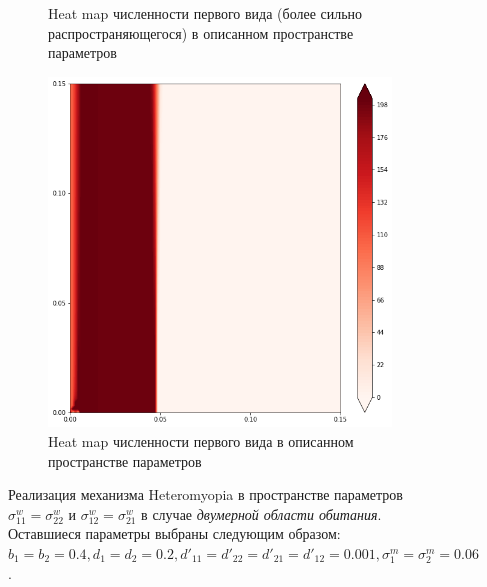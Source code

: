 \begin{figure}[ht]
\begin{subfigure}{.5\textwidth}
	\caption{Heat map численности первого вида (более сильно распространяющегося) в описанном пространстве параметров}
	\label{fig:hmd2:sub3}
\end{subfigure}%
\begin{subfigure}{.5\textwidth}
	\centering
	\includegraphics[width=.93\linewidth]{hm_d2_n2.png}
	\caption{Heat map численности первого вида в описанном пространстве параметров}
	\label{fig:hmd2:sub4}
\end{subfigure}
	\caption{Реализация механизма Heteromyopia в пространстве параметров  $\sigma_{11}^{w}=\sigma_{22}^{w}$ и $\sigma_{12}^{w}=\sigma_{21}^{w}$ в случае \emph{двумерной области обитания}. Оставшиеся параметры выбраны следующим образом: $b_{1}=b_{2}=0.4
		, d_{1}=d_{2}=0.2
		, d'_{11}=d'_{22}=d'_{21}=d'_{12}=0.001,
		\sigma_{1}^{m}=\sigma_{2}^{m}=0.06$. }
	\label{fig:hmd2}
\end{figure}

